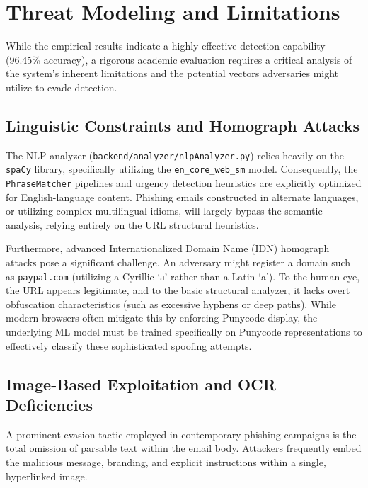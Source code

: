 \section{Threat Modeling and
Limitations}\label{threat-modeling-and-limitations}
While the empirical results indicate a highly effective detection
capability (96.45\% accuracy), a rigorous academic evaluation requires a
critical analysis of the system's inherent limitations and the potential
vectors adversaries might utilize to evade detection.

\subsection{Linguistic Constraints and Homograph
Attacks}\label{linguistic-constraints-and-homograph-attacks}

The NLP analyzer (\texttt{backend/analyzer/nlpAnalyzer.py}) relies
heavily on the \texttt{spaCy} library, specifically utilizing the
\texttt{en\_core\_web\_sm} model. Consequently, the
\texttt{PhraseMatcher} pipelines and urgency detection heuristics are
explicitly optimized for English-language content. Phishing emails
constructed in alternate languages, or utilizing complex multilingual
idioms, will largely bypass the semantic analysis, relying entirely on
the URL structural heuristics.

Furthermore, advanced Internationalized Domain Name (IDN) homograph
attacks pose a significant challenge. An adversary might register a
domain such as \texttt{pаypal.com} (utilizing a Cyrillic `а' rather than
a Latin `a'). To the human eye, the URL appears legitimate, and to the
basic structural analyzer, it lacks overt obfuscation characteristics
(such as excessive hyphens or deep paths). While modern browsers often
mitigate this by enforcing Punycode display, the underlying ML model
must be trained specifically on Punycode representations to effectively
classify these sophisticated spoofing attempts.

\subsection{Image-Based Exploitation and OCR
Deficiencies}\label{image-based-exploitation-and-ocr-deficiencies}

A prominent evasion tactic employed in contemporary phishing campaigns
is the total omission of parsable text within the email body. Attackers
frequently embed the malicious message, branding, and explicit
instructions within a single, hyperlinked image.

